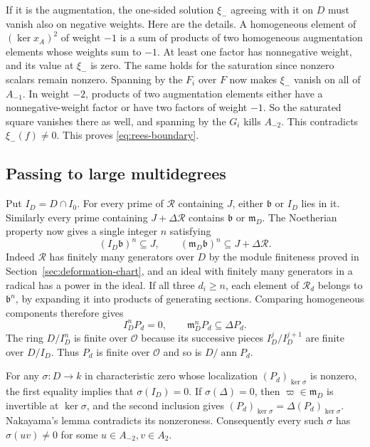If it is the augmentation, the one-sided solution \(\xi_-\) agreeing
with it on \(D\) must vanish also on negative weights. Here are the
details. A homogeneous element of \((\ker x_A)^2\) of weight \(-1\)
is a sum of products of two homogeneous augmentation elements whose
weights sum to \(-1\). At least one factor has nonnegative weight,
and its value at \(\xi_-\) is zero. The same holds for the saturation
since nonzero scalars remain nonzero. Spanning by the \(F_i\) over
\(F\) now makes \(\xi_-\) vanish on all of \(A_{-1}\). In weight
\(-2\), products of two augmentation elements either have a
nonnegative-weight factor or have two factors of weight \(-1\).
So the saturated square vanishes there as well, and spanning by the
\(G_i\) kills \(A_{-2}\). This contradicts \(\xi_-(f)\ne0\).
This proves \eqref{eq:rees-boundary}.

\subsection{Passing to large multidegrees}

Put \(I_D=D\cap I_0\). For every prime of \(\mathcal R\) containing
\(J\), either \(\mathfrak b\) or \(I_D\) lies in it. Similarly every
prime containing \(J+\Delta\mathcal R\) contains \(\mathfrak b\)
or \(\mathfrak m_D\). The Noetherian property now gives a single
integer \(n\) satisfying
\[
  (I_D\mathfrak b)^n\subseteq J,\qquad
  (\mathfrak m_D\mathfrak b)^n\subseteq J+\Delta\mathcal R.
\]
Indeed \(\mathcal R\) has finitely many generators over \(D\) by
the module finiteness proved in Section~\ref{sec:deformation-chart},
and an ideal with finitely many generators in a radical has a
power in the ideal. If all three \(d_i\ge n\), each element of
\(\mathcal R_d\) belongs to \(\mathfrak b^n\), by expanding it
into products of generating sections. Comparing homogeneous
components therefore gives
\[
                     I_D^nP_d=0,\qquad
                  \mathfrak m_D^nP_d\subseteq\Delta P_d .
\]
The ring \(D/I_D^n\) is finite over \(\mathcal O\) because its successive
pieces \(I_D^j/I_D^{j+1}\) are finite over \(D/I_D\). Thus \(P_d\)
is finite over \(\mathcal O\) and so is \(D/\operatorname{ann}P_d\).

For any \(\sigma:D\to k\) in characteristic zero whose localization
\((P_d)_{\ker\sigma}\) is nonzero, the first equality implies that
\(\sigma(I_D)=0\). If \(\sigma(\Delta)=0\), then \(\varpi\in\mathfrak m_D\)
is invertible at \(\ker\sigma\), and the second inclusion gives
\((P_d)_{\ker\sigma}=\Delta(P_d)_{\ker\sigma}\). Nakayama's lemma
contradicts its nonzeroness. Consequently every such \(\sigma\)
has \(\sigma(uv)\ne0\) for some \(u\in A_{-2},v\in A_2\).

